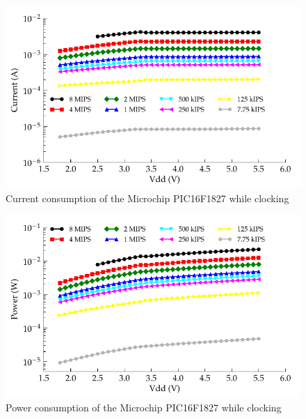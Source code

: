 \begin{figure}
\begin{centering}
\includegraphics{content/appendices/microprocessorPowerMeasurements/graphics/Graph_PIC16F1827_Clock_Current}
\par\end{centering}

\protect\caption{\label{fig:16F1827ClkCurrent}Current consumption of the Microchip
PIC16F1827 while clocking}


\end{figure}
\begin{figure}
\begin{centering}
\includegraphics{content/appendices/microprocessorPowerMeasurements/graphics/Graph_PIC16F1827_Clock_Power}
\par\end{centering}

\protect\caption{
\label{fig:16F1827ClkPower}Power consumption of the Microchip PIC16F1827
while clocking
}


\end{figure}
